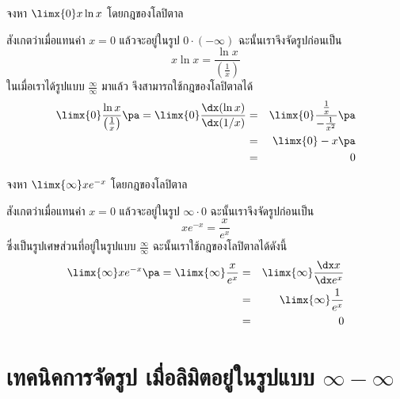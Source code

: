 \begin{frame}[t]
\begin{ex}
จงหา $\limx{0} x \ln x$ โดยกฎของโลปิตาล
\end{ex}\pa 
\begin{sol}
สังเกตว่าเมื่อแทนค่า $x=0$ แล้วจะอยู่ในรูป $0 \cdot (-\infty)$ ฉะนั้นเราจึงจัดรูปก่อนเป็น
\[ x \ln x = \frac{\ln x}{\left( \frac{1}{x} \right)}\] \pa
ในเมื่อเราได้รูปแบบ $\frac{\infty}{\infty}$ มาแล้ว จึงสามารถใช้กฎของโลปิตาลได้
\begin{eqnarray*}
\limx{0} \frac{\ln x}{\left( \frac{1}{x} \right)} \pa = \limx{0} \frac{\dx (\ln x)}{\dx (1/x)} &=& \limx{0} \frac{ \frac{1}{x}}{ -\frac{1}{x^2}} \pa \\
&=& \limx{0} -x\pa \\
&=& 0
\end{eqnarray*}
\end{sol}
\end{frame}




\begin{frame}[t]
\begin{ex}
จงหา $\limx{\infty} x e^{-x} $ โดยกฎของโลปิตาล
\end{ex}\pa 
\begin{sol}
สังเกตว่าเมื่อแทนค่า $x=0$ แล้วจะอยู่ในรูป $\infty \cdot 0$ ฉะนั้นเราจึงจัดรูปก่อนเป็น
\[x e^{-x} = \frac{x}{e^x}\] \pa
ซึ่งเป็นรูปเศษส่วนที่อยู่ในรูปแบบ $\frac{\infty}{\infty}$ ฉะนั้นเราใช้กฎของโลปิตาลได้ดังนี้
\begin{eqnarray*}
\limx{\infty} x e^{-x} \pa = \limx{\infty} \frac{x}{e^x} &=& \limx{\infty} \frac{\dx x}{\dx e^x} \\
&=& \limx{\infty} \frac{1}{e^x}  \\
&=& 0
\end{eqnarray*}
\end{sol}
\end{frame}

\section[$\infty - \infty$]{เทคนิคการจัดรูป เมื่อลิมิตอยู่ในรูปแบบ $\infty - \infty$}
\frame{\sectionpage}


